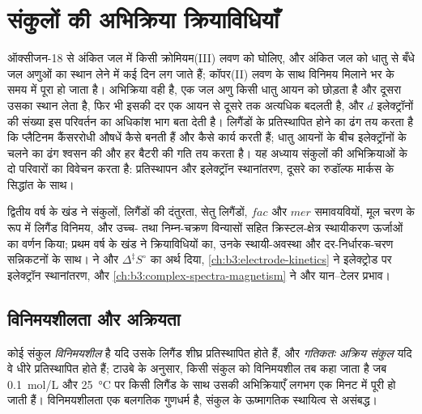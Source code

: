 \chapter{संकुलों की अभिक्रिया क्रियाविधियाँ}\label{ch:b3:complex-mechanisms}

ऑक्सीजन-18 से अंकित जल में किसी क्रोमियम(III) लवण को घोलिए, और अंकित जल को
धातु से बँधे जल अणुओं का स्थान लेने में कई दिन लग जाते हैं; कॉपर(II) लवण के साथ
विनिमय मिलाने भर के समय में पूरा हो जाता है। अभिक्रिया वही है, एक जल अणु किसी धातु आयन
को छोड़ता है और दूसरा उसका स्थान लेता है, फिर भी इसकी दर एक आयन से दूसरे तक
अत्यधिक बदलती है, और $d$ इलेक्ट्रॉनों की संख्या इस परिवर्तन का अधिकांश भाग बता देती है।
लिगैंडों के प्रतिस्थापित होने का ढंग तय करता है कि प्लैटिनम कैंसररोधी औषधें कैसे बनती हैं और कैसे
कार्य करती हैं; धातु आयनों के बीच इलेक्ट्रॉनों के चलने का ढंग श्वसन की और हर बैटरी की
गति तय करता है। यह अध्याय संकुलों की अभिक्रियाओं के दो परिवारों का विवेचन करता है:
प्रतिस्थापन और इलेक्ट्रॉन स्थानांतरण, दूसरे का रुडॉल्फ मार्कस के सिद्धांत के साथ।

\begin{recall}
द्वितीय वर्ष के खंड ने संकुलों, लिगैंडों की दंतुरता, सेतु
लिगैंडों, $fac$ और $mer$ समावयवियों, मूल चरण के रूप में लिगैंड विनिमय, और
उच्च- तथा निम्न-चक्रण विन्यासों सहित क्रिस्टल-क्षेत्र स्थायीकरण ऊर्जाओं का वर्णन किया;
प्रथम वर्ष के खंड ने क्रियाविधियों का, उनके स्थायी-अवस्था और दर-निर्धारक-चरण
सन्निकटनों के साथ।  ने  और
$\Delta^{\ddagger}S^\circ$ का अर्थ दिया, \cref{ch:b3:electrode-kinetics} ने इलेक्ट्रोड पर
इलेक्ट्रॉन स्थानांतरण, और \cref{ch:b3:complex-spectra-magnetism} ने  और
यान--टेलर प्रभाव।
\end{recall}

\section{विनिमयशीलता और अक्रियता}

\begin{definition}[विनिमयशील और अक्रिय संकुल]\label{def:b3:complex-mechanisms:labile}
कोई संकुल \emph{विनिमयशील} है यदि उसके लिगैंड
शीघ्र प्रतिस्थापित होते हैं, और \emph{गतिकतः अक्रिय संकुल}
यदि वे धीरे प्रतिस्थापित होते हैं; टाउबे के अनुसार, किसी संकुल को विनिमयशील तब कहा जाता है जब
\qty{0.1}{mol/L} और \qty{25}{\celsius} पर किसी लिगैंड के साथ उसकी अभिक्रियाएँ लगभग एक
मिनट में पूरी हो जाती हैं। विनिमयशीलता एक बलगतिक गुणधर्म है, संकुल के ऊष्मागतिक स्थायित्व से
असंबद्ध।
\end{definition}

